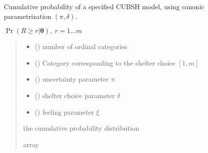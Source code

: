 \documentclass[letterpaper,10pt,english]{sphinxmanual}
\begin{document}

\begin{fulllineitems}
\label{\detokenize{cubmods:cubmods.cubsh.cmf_delta}}
\pysigstartsignatures
{}
\pysigstopsignatures
\sphinxAtStartPar
Cumulative probability of a specified CUBSH model,
using canonic parametrization \((\pi, \delta)\).

\sphinxAtStartPar
\(\Pr(R \geq r | \pmb\theta),\; r=1 \ldots m\)
\begin{quote}\begin{description}
\begin{itemize}
\item {} 
\sphinxAtStartPar
{} () \textendash{} number of ordinal categories

\item {} 
\sphinxAtStartPar
{} () \textendash{} Category corresponding to the shelter choice \([1,m]\)

\item {} 
\sphinxAtStartPar
{} () \textendash{} uncertainty parameter \(\pi\)

\item {} 
\sphinxAtStartPar
{} () \textendash{} shelter choice parameter \(\delta\)

\item {} 
\sphinxAtStartPar
{} () \textendash{} feeling parameter \(\xi\)

\end{itemize}

\sphinxAtStartPar
the cumulative probability distribution

\sphinxAtStartPar
array

\end{description}\end{quote}

\end{fulllineitems}
\end{document}
